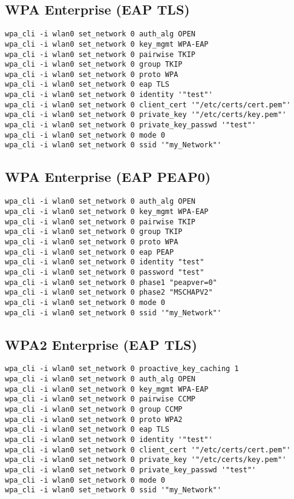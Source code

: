 \subsection{WPA Enterprise (EAP TLS)}
\begin{lstlisting}[style=text]
wpa_cli -i wlan0 set_network 0 auth_alg OPEN
wpa_cli -i wlan0 set_network 0 key_mgmt WPA-EAP
wpa_cli -i wlan0 set_network 0 pairwise TKIP
wpa_cli -i wlan0 set_network 0 group TKIP
wpa_cli -i wlan0 set_network 0 proto WPA
wpa_cli -i wlan0 set_network 0 eap TLS
wpa_cli -i wlan0 set_network 0 identity '"test"'
wpa_cli -i wlan0 set_network 0 client_cert '"/etc/certs/cert.pem"'
wpa_cli -i wlan0 set_network 0 private_key '"/etc/certs/key.pem"'
wpa_cli -i wlan0 set_network 0 private_key_passwd '"test"'
wpa_cli -i wlan0 set_network 0 mode 0
wpa_cli -i wlan0 set_network 0 ssid '"my_Network"'
\end{lstlisting}

\subsection{WPA Enterprise (EAP PEAP0)}
\begin{lstlisting}[style=text]
wpa_cli -i wlan0 set_network 0 auth_alg OPEN
wpa_cli -i wlan0 set_network 0 key_mgmt WPA-EAP
wpa_cli -i wlan0 set_network 0 pairwise TKIP
wpa_cli -i wlan0 set_network 0 group TKIP
wpa_cli -i wlan0 set_network 0 proto WPA
wpa_cli -i wlan0 set_network 0 eap PEAP
wpa_cli -i wlan0 set_network 0 identity "test"
wpa_cli -i wlan0 set_network 0 password "test"
wpa_cli -i wlan0 set_network 0 phase1 "peapver=0"
wpa_cli -i wlan0 set_network 0 phase2 "MSCHAPV2"
wpa_cli -i wlan0 set_network 0 mode 0
wpa_cli -i wlan0 set_network 0 ssid '"my_Network"'
\end{lstlisting}

\subsection{WPA2 Enterprise (EAP TLS)}
\begin{lstlisting}[style=text]
wpa_cli -i wlan0 set_network 0 proactive_key_caching 1
wpa_cli -i wlan0 set_network 0 auth_alg OPEN
wpa_cli -i wlan0 set_network 0 key_mgmt WPA-EAP
wpa_cli -i wlan0 set_network 0 pairwise CCMP
wpa_cli -i wlan0 set_network 0 group CCMP
wpa_cli -i wlan0 set_network 0 proto WPA2
wpa_cli -i wlan0 set_network 0 eap TLS
wpa_cli -i wlan0 set_network 0 identity '"test"'
wpa_cli -i wlan0 set_network 0 client_cert '"/etc/certs/cert.pem"'
wpa_cli -i wlan0 set_network 0 private_key '"/etc/certs/key.pem"'
wpa_cli -i wlan0 set_network 0 private_key_passwd '"test"'
wpa_cli -i wlan0 set_network 0 mode 0
wpa_cli -i wlan0 set_network 0 ssid '"my_Network"'
\end{lstlisting}

